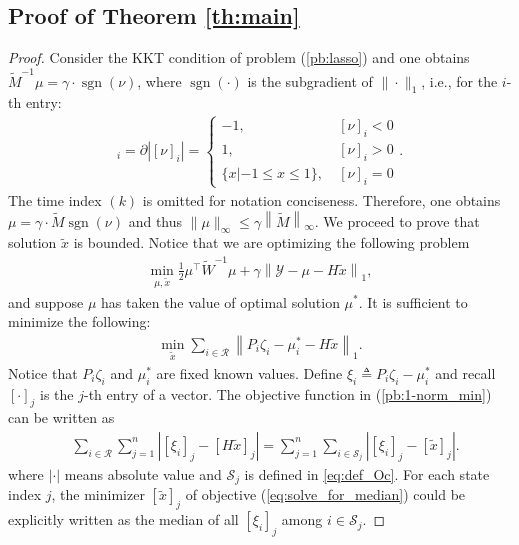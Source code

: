 \documentclass{ieeetrans}   %
\newcommand{\Cb}{{\mathbb{C}}}
\newcommand{\Rc}{{\mathcal{R}}}
\newcommand{\Sc}{{\mathcal{S}}}
\newcommand{\Yc}{{\mathcal{Y}}}
\newcommand{\ift}{{\infty}}
\DeclareMathOperator{\sgn}{{sgn}}
\newtheorem*{proof}{\textbf{Proof}}
\begin{document}
\subsection{Proof of Theorem \ref{th:main}}\label{ap:th_main}
\begin{proof}
	Consider the KKT condition of problem (\ref{pb:lasso}) and one obtains $\tilde{M}^{-1}\mu=\gamma\cdot \sgn(\nu)$,	
	where $\sgn(\cdot)$ is the subgradient of $\|\cdot\|_1$, i.e., for the $i$-th entry:
	\begin{align*}
		[\sgn(\nu)]_i=\partial |[\nu]_i|=
		\left\{
		\begin{array}{cc}
			-1 ,& \ [\nu]_i<0 \\
			1 , &\ [\nu]_i>0  \\
			\{x|-1\leq x\leq 1\},& \ [\nu]_i=0 
		\end{array}
		\right. .
	\end{align*}
	The time index $(k)$ is omitted for notation conciseness.
	Therefore, one obtains $\mu=\gamma\cdot \tilde{M}\sgn(\nu)$ and thus
	$\|\mu\|_\ift\leq \gamma \left\|\tilde{M}\right\|_\ift$.
	We proceed to prove that solution $\tilde{x}$ is bounded.
	Notice that we are optimizing the following problem %
	\begin{align*}%
		\min _{\mu,\tilde{x}} \frac{1}{2} \mu^{\top} \tilde{W}^{-1} \mu+\gamma\left\|\Yc-\mu-H \tilde{x}\right\|_1 ,
	\end{align*}
	and suppose $\mu$ has taken the value of optimal solution $\mu^*$.
	It is sufficient to minimize the following:
	\begin{align}\label{pb:1-norm_min}
		\min_{\tilde{x}} \sum_{i\in\Rc} \left\|P_i \zeta_{i}-\mu^*_{i}- H\tilde{x} \right\|_1  .
	\end{align}
	Notice that $P_i \zeta_{i}$ and $\mu^*_{i}$ are fixed known values.
	Define $\xi_i\triangleq P_i \zeta_{i}-\mu^*_{i} $ and recall $[\cdot]_j$ is the $j$-th entry of a vector. The objective function in (\ref{pb:1-norm_min}) can be written as
	\begin{align}
		&\sum_{i\in\Rc}\sum_{j=1}^{n} \left| [\xi_i]_j -[H \tilde{x}]_j \right| 
		=\sum_{j=1}^{n}\sum_{i\in\Sc_j} \left| [\xi_i]_j -[\tilde{x}]_j \right| . \label{eq:solve_for_median}
	\end{align}
	where $|\cdot|$ means absolute value and $\Sc_j$ is defined in \eqref{eq:def_Oc}. 
	For each state index $j$, the minimizer $[\tilde{x}]_j$ of objective (\ref{eq:solve_for_median}) could be explicitly written as the median of all $[\xi_i]_j$ among $i\in\Sc_j$.
	

\end{proof}
\end{document}
